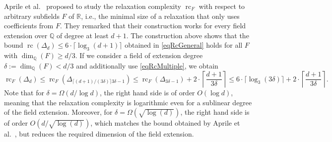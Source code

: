 \documentclass[11pt]{article}
\newcommand{\rc}{\operatorname{rc}}
\newcommand{\R}{\mathbb{R}}
\newcommand{\Q}{\mathbb{Q}}
\begin{document}
Aprile et al.~\cite{Aprile2024} proposed to study the relaxation complexity $\rc_F$ with respect to arbitrary subfields $F$ of $\R$, i.e., the minimal size of a relaxation that only uses coefficients from $F$. They remarked that their construction works for every field extension over $\Q$ of degree at least $d+1$.
The construction above shows that the bound $\rc(\Delta_d) \le 6 \cdot \lceil  \log_3 (d+1) \bigr \rceil$ obtained in \eqref{eqRcGeneral} holds for all $F$ with $\dim_\Q(F) \ge d/3$. If we consider a field of extension degree $\delta := \dim_\Q(F) <  d/3$ and additionally use \eqref{eqRcMultiple}, we obtain
\[
    \rc_F(\Delta_d) \le \rc_F(\Delta_{\lceil (d+1)/(3\delta)\rceil 3 \delta - 1}) \le \rc_F(\Delta_{3\delta-1}) + 2 \cdot \left\lceil \frac{d+1}{3\delta} \right\rceil \le 6 \cdot \lceil  \log_3 (3 \delta) \bigr \rceil + 2 \cdot \left\lceil \frac{d+1}{3\delta} \right\rceil.
\]
Note that for $\delta = \Omega(d/\log d)$, the right hand side is of order $O(\log d)$, meaning that the relaxation complexity is logarithmic even for a sublinear degree of the field extension. Moreover, for $\delta = \Omega(\sqrt{\log(d)})$, the right hand side is of order $O(d/\sqrt{\log(d)})$, which matches the bound obtained by Aprile et al.~\cite{Aprile2024}, but reduces the required dimension of the field extension.



\end{document}
